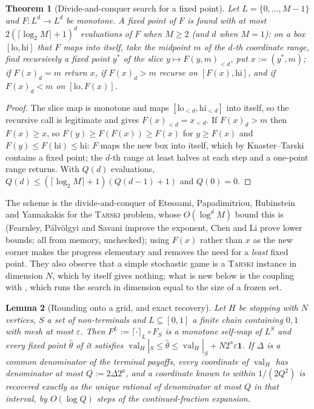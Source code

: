 \documentclass[11pt]{article}
\theoremstyle{plain}
\newtheorem{theorem}{Theorem}[section]
\newtheorem{lemma}[theorem]{Lemma}
\theoremstyle{definition}
\DeclareMathOperator{\val}{val}
\newcommand{\bbone}{\mathbf{1}}
\begin{document}
\begin{theorem}[Divide-and-conquer search for a fixed point]\label{thm:tarski}
Let $L=\{0,\dots,M-1\}$ and $F:L^{d}\to L^{d}$ be monotone. A fixed point
of $F$ is found with at most $2(\lceil\log_2M\rceil+1)^{d}$ evaluations
of $F$ when $M\ge2$ (and $d$ when $M=1$): on a box $[\mathrm{lo},\mathrm{hi}]$ that $F$ maps into itself,
take the midpoint $m$ of the $d$-th coordinate range, find recursively a
fixed point $y^{\ast}$ of the slice $y\mapsto F(y,m)_{<d}$, put
$x:=(y^{\ast},m)$; if $F(x)_d=m$ return $x$, if $F(x)_d>m$ recurse on
$[F(x),\mathrm{hi}]$, and if $F(x)_d<m$ on $[\mathrm{lo},F(x)]$.
\end{theorem}

\begin{proof}
The slice map is monotone and maps $[\mathrm{lo}_{<d},\mathrm{hi}_{<d}]$
into itself, so the recursive call is legitimate and gives
$F(x)_{<d}=x_{<d}$. If $F(x)_d>m$ then $F(x)\ge x$, so $F(y)\ge F(F(x))\ge F(x)$
for $y\ge F(x)$ and $F(y)\le F(\mathrm{hi})\le\mathrm{hi}$: $F$ maps the new
box into itself, which by Knaster--Tarski contains a fixed point; the
$d$-th range at least halves at each step and a one-point range returns.
With $Q(d)$ evaluations, $Q(d)\le(\lceil\log_2M\rceil+1)(Q(d-1)+1)$ and
$Q(0)=0$.
\end{proof}

The scheme is the divide-and-conquer of Etessami, Papadimitriou,
Rubinstein and Yannakakis for the \textsc{Tarski} problem, whose
$O(\log^{d}M)$ bound this is (Fearnley, P\'alv\"olgyi and Savani improve
the exponent, Chen and Li prove lower bounds; all from memory, unchecked);
using $F(x)$ rather than $x$ as the new corner makes the progress
elementary and removes the need for a \emph{least} fixed point. They also
observe that a simple stochastic game is a \textsc{Tarski} instance in
dimension $N$, which by itself gives nothing; what is new below is the
coupling with , which runs the search in dimension equal to
the size of a frozen set.

\begin{lemma}[Rounding onto a grid, and exact recovery]\label{lem:round-recover}
Let $H$ be stopping with $N$ vertices, $S$ a set of non-terminals and
$L\subseteq[0,1]$ a finite chain containing $0,1$ with mesh at most
$\varepsilon$. Then $F^{L}:=\lceil\cdot\rceil_L\circ F_S$ is a monotone
self-map of $L^{S}$ and every fixed point $\hat\theta$ of it satisfies
$\val_H|_S\le\hat\theta\le\val_H|_S+N2^{a}\varepsilon\bbone$. If $\Delta$
is a common denominator of the terminal payoffs, every coordinate of
$\val_H$ has denominator at most $Q:=2\Delta2^{a}$, and a coordinate known
to within $1/(2Q^{2})$ is recovered exactly as the unique rational of
denominator at most $Q$ in that interval, by $O(\log Q)$ steps of the
continued-fraction expansion.
\end{lemma}
\end{document}
